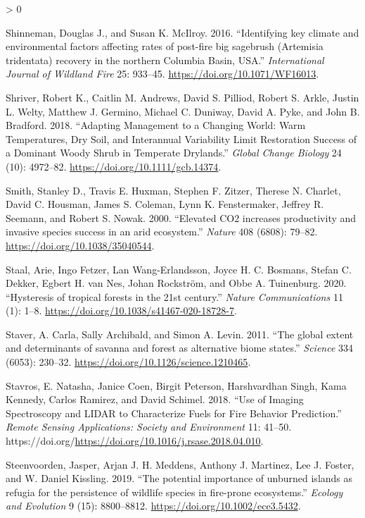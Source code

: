 \documentclass[
  12pt,
]{article}
\newlength{\cslhangindent}
\newenvironment{CSLReferences}[2] %
 {%
  \setlength{\parindent}{0pt}
  \ifodd #1 \everypar{\setlength{\hangindent}{\cslhangindent}}\ignorespaces\fi
  \ifnum #2 > 0
  \setlength{\parskip}{#2\baselineskip}
  \fi
 }%
 {}
\begin{document}
\begin{CSLReferences}{1}{0}
\leavevmode\hypertarget{ref-Shinneman2016}{}%
Shinneman, Douglas J., and Susan K. McIlroy. 2016. {``{Identifying key
climate and environmental factors affecting rates of post-fire big
sagebrush (Artemisia tridentata) recovery in the northern Columbia
Basin, USA}.''} \emph{International Journal of Wildland Fire} 25:
933--45. \url{https://doi.org/10.1071/WF16013}.

\leavevmode\hypertarget{ref-Shriver2018}{}%
Shriver, Robert K., Caitlin M. Andrews, David S. Pilliod, Robert S.
Arkle, Justin L. Welty, Matthew J. Germino, Michael C. Duniway, David A.
Pyke, and John B. Bradford. 2018. {``Adapting Management to a Changing
World: {Warm} Temperatures, Dry Soil, and Interannual Variability Limit
Restoration Success of a Dominant Woody Shrub in Temperate Drylands.''}
\emph{Global Change Biology} 24 (10): 4972--82.
\url{https://doi.org/10.1111/gcb.14374}.

\leavevmode\hypertarget{ref-Smith2000}{}%
Smith, Stanley D., Travis E. Huxman, Stephen F. Zitzer, Therese N.
Charlet, David C. Housman, James S. Coleman, Lynn K. Fenstermaker,
Jeffrey R. Seemann, and Robert S. Nowak. 2000. {``{Elevated CO2
increases productivity and invasive species success in an arid
ecosystem}.''} \emph{Nature} 408 (6808): 79--82.
\url{https://doi.org/10.1038/35040544}.

\leavevmode\hypertarget{ref-Staal2020}{}%
Staal, Arie, Ingo Fetzer, Lan Wang-Erlandsson, Joyce H. C. Bosmans,
Stefan C. Dekker, Egbert H. van Nes, Johan Rockström, and Obbe A.
Tuinenburg. 2020. {``{Hysteresis of tropical forests in the 21st
century}.''} \emph{Nature Communications} 11 (1): 1--8.
\url{https://doi.org/10.1038/s41467-020-18728-7}.

\leavevmode\hypertarget{ref-Staver2011}{}%
Staver, A. Carla, Sally Archibald, and Simon A. Levin. 2011. {``{The
global extent and determinants of savanna and forest as alternative
biome states}.''} \emph{Science} 334 (6053): 230--32.
\url{https://doi.org/10.1126/science.1210465}.

\leavevmode\hypertarget{ref-Stavros2018}{}%
Stavros, E. Natasha, Janice Coen, Birgit Peterson, Harshvardhan Singh,
Kama Kennedy, Carlos Ramirez, and David Schimel. 2018. {``Use of Imaging
Spectroscopy and {LIDAR} to Characterize Fuels for Fire Behavior
Prediction.''} \emph{Remote Sensing Applications: Society and
Environment} 11: 41--50.
https://doi.org/\url{https://doi.org/10.1016/j.rsase.2018.04.010}.

\leavevmode\hypertarget{ref-Steenvoorden2019}{}%
Steenvoorden, Jasper, Arjan J. H. Meddens, Anthony J. Martinez, Lee J.
Foster, and W. Daniel Kissling. 2019. {``{The potential importance of
unburned islands as refugia for the persistence of wildlife species in
fire-prone ecosystems}.''} \emph{Ecology and Evolution} 9 (15):
8800--8812. \url{https://doi.org/10.1002/ece3.5432}.


\end{CSLReferences}
\end{document}
